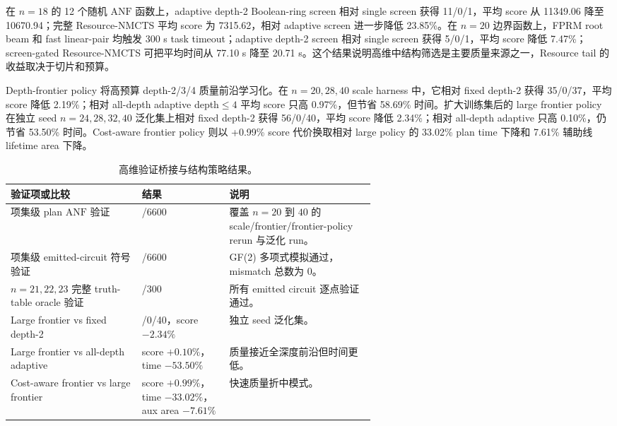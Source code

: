 \documentclass[UTF8,fontset=macnew,11pt]{ctexart}
\newcommand{\method}{Resource-NMCTS}
\newcommand{\anf}{\ensuremath{\mathrm{ANF}}}
\newcommand{\ttable}{truth-table}
\begin{document}
在 $n=18$ 的 12 个随机 \anf{} 函数上，adaptive depth-2 Boolean-ring screen 相对 single screen 获得 11/0/1，平均 score 从 11349.06 降至 10670.94；完整 \method{} 平均 score 为 7315.62，相对 adaptive screen 进一步降低 23.85\%。在 $n=20$ 边界函数上，FPRM root beam 和 fast linear-pair 均触发 300 s task timeout；adaptive depth-2 screen 相对 single screen 获得 5/0/1，平均 score 降低 7.47\%；screen-gated \method{} 可把平均时间从 77.10 s 降至 20.71 s。这个结果说明高维中结构筛选是主要质量来源之一，Resource tail 的收益取决于切片和预算。

Depth-frontier policy 将高预算 depth-2/3/4 质量前沿学习化。在 $n=20,28,40$ scale harness 中，它相对 fixed depth-2 获得 35/0/37，平均 score 降低 2.19\%；相对 all-depth adaptive depth$\leq4$ 平均 score 只高 0.97\%，但节省 58.69\% 时间。扩大训练集后的 large frontier policy 在独立 seed $n=24,28,32,40$ 泛化集上相对 fixed depth-2 获得 56/0/40，平均 score 降低 2.34\%；相对 all-depth adaptive 只高 0.10\%，仍节省 53.50\% 时间。Cost-aware frontier policy 则以 +0.99\% score 代价换取相对 large policy 的 33.02\% plan time 下降和 7.61\% 辅助线 lifetime area 下降。

\begin{table}[H]
\centering
\small
\caption{高维验证桥接与结构策略结果。}
\label{tab:highdim-validation}
\begin{tabularx}{\linewidth}{>{\raggedright\arraybackslash}p{0.36\linewidth}>{\raggedright\arraybackslash}p{0.24\linewidth}>{\raggedright\arraybackslash}X}
\toprule
验证项或比较 & 结果 & 说明 \\
\midrule
项集级 plan \anf{} 验证 & 6600/6600 & 覆盖 $n=20$ 到 $40$ 的 scale/frontier/frontier-policy rerun 与泛化 run。 \\
项集级 emitted-circuit 符号验证 & 6600/6600 & GF(2) 多项式模拟通过，mismatch 总数为 0。 \\
$n=21,22,23$ 完整 \ttable{} oracle 验证 & 300/300 & 所有 emitted circuit 逐点验证通过。 \\
Large frontier vs fixed depth-2 & 56/0/40，score $-2.34\%$ & 独立 seed 泛化集。 \\
Large frontier vs all-depth adaptive & score $+0.10\%$，time $-53.50\%$ & 质量接近全深度前沿但时间更低。 \\
Cost-aware frontier vs large frontier & score $+0.99\%$，time $-33.02\%$，aux area $-7.61\%$ & 快速质量折中模式。 \\
\bottomrule
\end{tabularx}
\end{table}
\end{document}

